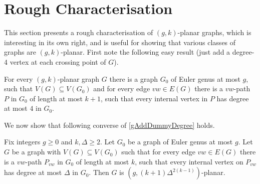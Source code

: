 \documentclass{patmorin}
\newcommand{\PP}{\mathcal{P}}
\renewcommand{\geq}{\geqslant}
\begin{document}
%

\section{Rough Characterisation}
\label{Characterisation}

This section presents a rough characterisation of $(g,k)$-planar graphs, which is interesting in its own right, and is useful for showing that various classes of graphs are $(g,k)$-planar. First note the following easy result (just add a degree-4 vertex at each crossing point of $G$). 

\begin{lem}
\label{gAddDummyDegree}
For every $(g,k)$-planar graph $G$ there is a graph $G_0$ of Euler
genus at most $g$, such that $V(G) \subseteq V(G_0)$ and for every
edge $vw \in E(G)$ there is a $vw$-path $P$ in $G_0$ of length at most
$k+1$, such that every internal vertex in $P$ has degree at most $4$
in $G_0$.
\end{lem}



We now show that following converse of \cref{gAddDummyDegree}  holds.

\begin{lem} 
\label{DrawG}
Fix integers $g\geq 0$ and $k,\Delta\geq 2$. 
Let $G_0$ be a graph of Euler genus at most $g$. Let $G$ be
a graph with $V(G) \subseteq V(G_0)$ such that for every edge $vw \in
E(G)$ there is a $vw$-path $P_{vw}$ in $G_0$ of length at most $k$, such
that every internal vertex on $P_{vw}$ has degree at most $\Delta$ in
$G_0$. Then $G$ is $(g, (k+1)\Delta^{2(k-1)} )$-planar.
\end{lem}
\end{document}
